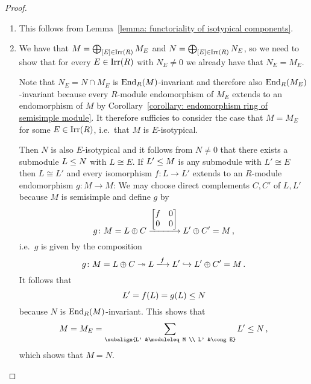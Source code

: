\begin{proof}
  \leavevmode
  \begin{enumerate}
    \item
      This follows from Lemma~\ref{lemma: functoriality of isotypical components}.
    \item
      We have that $M = \bigoplus_{[E] \in \operatorname{Irr}(R)} M_E$ and $N = \bigoplus_{[E] \in \operatorname{Irr}(R)} N_E$, so we need to show that for every $E \in \operatorname{Irr}(R)$ with $N_E \neq 0$ we already have that $N_E = M_E$.
      
      Note that $N_E = N \cap M_E$ is $\operatorname{End}_{R}(M)$-invariant and therefore also $\operatorname{End}_{R}(M_E)$-invariant because every $R$-module endomorphism of $M_E$ extends to an endomorphism of $M$ by Corollary~\ref{corollary: endomorphism ring of semisimple module}. 
      It therefore sufficies to consider the case that $M = M_E$ for some $E \in \operatorname{Irr}(R)$, i.e.\ that $M$ is $E$-isotypical.
      
      Then $N$ is also $E$-isotypical and it follows from $N \neq 0$ that there exists a submodule $L \leq N$ with $L \cong E$.
      If $L' \leq M$ is any submodule with $L' \cong E$ then $L \cong L'$ and every isomorphism $f \colon L \to L'$ extends to an $R$-module endomorphism $g \colon M \to M$:
      We may choose direct complements $C, C'$ of $L, L'$ because $M$ is semisimple and define $g$ by
      \[
                g
        \colon  M
        =       L \oplus C
        \xlongrightarrow{ \begin{bmatrix} f & 0 \\ 0 & 0 \end{bmatrix} }
                L' \oplus C'
        =       M \,,
      \]
      i.e.\ $g$ is given by the composition
      \[
                            g
        \colon              M
        =                   L \oplus C
        \projection         L
        \xlongrightarrow{f} L'
        \inclusion          L' \oplus C'
        =                   M \,.
      \]
      It follows that
      \[
                    L'
        =           f(L)
        =           g(L)
        \leq  N
      \]
      because $N$ is $\operatorname{End}_R(M)$-invariant.
      This shows that
      \[
                    M
        =           M_E
        =           \sum_{\subalign{L' &\moduleleq M \\ L' &\cong E}} L'
        \moduleleq  N \,,
      \]
      which shows that $M = N$.
    \qedhere
  \end{enumerate}
\end{proof}


